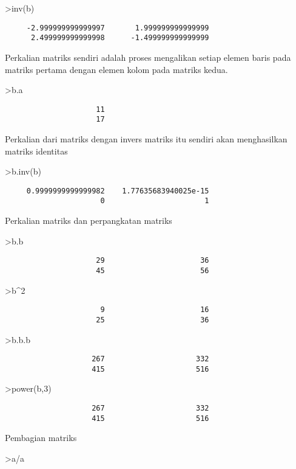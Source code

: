 \documentclass[
]{book}
\begin{document}
\textgreater inv(b)

\begin{verbatim}
     -2.999999999999997       1.999999999999999 
      2.499999999999998      -1.499999999999999 
\end{verbatim}

Perkalian matriks sendiri adalah proses mengalikan setiap elemen baris pada matriks pertama dengan elemen kolom pada matriks kedua.

\textgreater b.a

\begin{verbatim}
                     11 
                     17 
\end{verbatim}

Perkalian dari matriks dengan invers matriks itu sendiri akan menghasilkan matriks identitas

\textgreater b.inv(b)

\begin{verbatim}
     0.9999999999999982    1.77635683940025e-15 
                      0                       1 
\end{verbatim}

Perkalian matriks dan perpangkatan matriks

\textgreater b.b

\begin{verbatim}
                     29                      36 
                     45                      56 
\end{verbatim}

\textgreater b\^{}2

\begin{verbatim}
                      9                      16 
                     25                      36 
\end{verbatim}

\textgreater b.b.b

\begin{verbatim}
                    267                     332 
                    415                     516 
\end{verbatim}

\textgreater power(b,3)

\begin{verbatim}
                    267                     332 
                    415                     516 
\end{verbatim}

Pembagian matriks

\textgreater a/a
\end{document}
